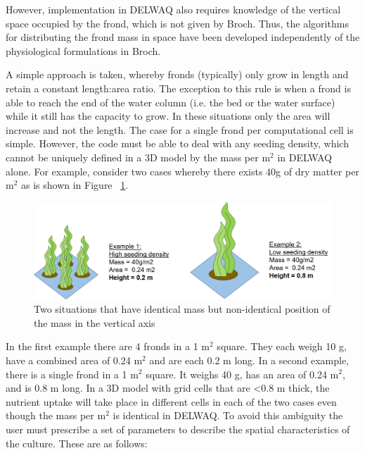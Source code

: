 \documentclass{deltares_manual}
\begin{document}
However, implementation in DELWAQ also requires knowledge of the vertical space occupied by the frond, which is not given by Broch. Thus, the algorithms for distributing the frond mass in space have been developed independently of the physiological formulations in Broch. 

A simple approach is taken, whereby fronds (typically) only grow in length and retain a constant length:area ratio. The exception to this rule is when a frond is able to reach the end of the water column (i.e. the bed or the water surface) while it still has the capacity to grow. In these situations only the area will increase and not the length. The case for a single frond per computational cell is simple. However, the code must be able to deal with any seeding density, which cannot be uniquely defined in a 3D model by the mass per m$^{2}$ in DELWAQ alone. For example, consider two cases whereby there exists 40g of dry matter per m$^{2}$ as is shown in Figure ~\ref{fig:ambiguoussituation}. 
\begin{figure}[H]
	\centering
	\includegraphics[width=1\linewidth]{figures/ambiguous_situation}
	\caption{Two situations that have identical mass but non-identical position of the mass in the vertical axis}
	\label{fig:ambiguoussituation}
\end{figure}
In the first example there are 4 fronds in a 1 m$^{2}$ square. They each weigh 10 g, have a combined area of 0.24 m$^{2}$ and are each 0.2 m long. In a second example, there is a single frond in a 1 m$^{2}$ square. It weighs 40 g, has an area of 0.24 m$^{2}$, and is 0.8 m long. In a 3D model with grid cells that are \textless 0.8 m thick, the nutrient uptake will take place in different cells in each of the two cases even though the mass per m$^{2}$ is identical in DELWAQ. To avoid this ambiguity the user must prescribe a set of parameters to describe the spatial characteristics of the culture. These are as follows:
\end{document}
